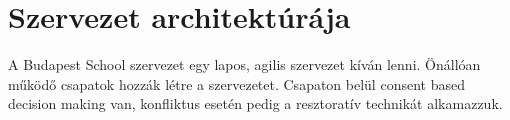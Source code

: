 \section{Szervezet architektúrája}
A Budapest School szervezet egy lapos, agilis szervezet kíván lenni. Önállóan működő csapatok hozzák létre a szervezetet. Csapaton belül consent based decision making van, konfliktus esetén pedig a resztoratív technikát alkamazzuk.

